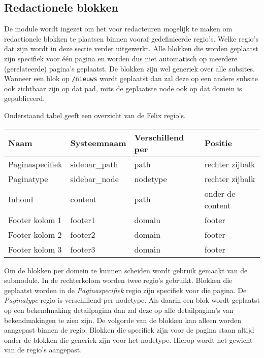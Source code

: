 \subsection{Redactionele blokken}\label{felix}

De module  wordt ingezet om het voor redacteuren mogelijk te maken om redactionele blokken te plaatsen binnen vooraf gedefinieerde regio's. Welke regio's dat zijn wordt in deze sectie verder uitgewerkt. Alle blokken die worden geplaatst zijn specifiek voor \'{e}\'{e}n pagina en worden dus niet automatisch op meerdere (gerelateerde) pagina's geplaatst. De blokken zijn wel generiek over alle subsites. Wanneer een blok op \texttt{/nieuws} wordt geplaatst dan zal deze op een andere subsite ook zichtbaar zijn op dat pad, mits de geplaatste node ook op dat domein is gepubliceerd.

Onderstaand tabel geeft een overzicht van de Felix regio's.

\begin{tabularx}{\linewidth}{| p{3cm} | p{3cm} | X | p{3cm} | }
\hline
\rowcolor{tableheader}
\textbf{Naam} & \textbf{Systeemnaam} & \textbf{Verschillend per} & \textbf{Positie} \\ \hline
Paginaspecifiek & sidebar\_path & path & rechter zijbalk \\ \hline
Paginatype & sidebar\_node & nodetype & rechter zijbalk \\ \hline
Inhoud & content & path & onder de content \\ \hline
Footer kolom 1 & footer1 & domain & footer \\ \hline
Footer kolom 2 & footer2 & domain & footer \\ \hline
Footer kolom 3 & footer3 & domain & footer \\ \hline
\end{tabularx}

Om de blokken per domein te kunnen scheiden wordt gebruik gemaakt van de  submodule. In de rechterkolom worden twee regio's gebruikt. Blokken die geplaatst worden in de \emph{Paginaspecifiek} regio zijn specifiek voor die pagina. De \emph{Paginatype} regio is verschillend per nodetype. Als daarin een blok wordt geplaatst op een bekendmaking detailpagina dan zal deze op alle detailpagina's van bekendmakingen te zien zijn. De volgorde van de blokken kan alleen worden aangepast binnen de regio. Blokken die specifiek zijn voor de pagina staan altijd onder de blokken die generiek zijn voor het nodetype. Hierop wordt het gewicht van de regio's aangepast.


